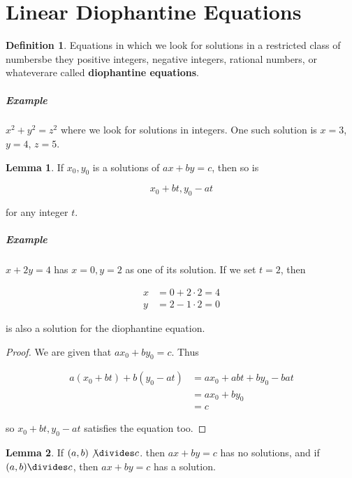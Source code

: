 \documentclass{article}
\theoremstyle{definition} %
\theoremstyle{definition}
\theoremstyle{definition}
\newtheorem{lemma}{Lemma}[section]
\theoremstyle{definition}
\newtheorem{definition}{Definition}[section]
\begin{document}
  \section{Linear Diophantine Equations}
  
  \begin{definition}
    Equations in which we look for solutions in a restricted class of numbers\textemdash be they positive
    integers, negative integers, rational numbers, or whatever\textemdash are called \textbf{diophantine
    equations}.
  \end{definition}
  
  \subparagraph{Example} $x^2 + y^2 = z^2$ where we look for solutions in integers. One such solution
  is $x = 3$, $y = 4$, $z = 5$.
  
  \begin{lemma}
    If $x_0, y_0$ is a solutions of $ax + by = c$, then so is
    
    \begin{equation*}
      x_0 + bt, y_0 - at
    \end{equation*}
    
    for any integer $t$.
  \end{lemma}
  
  \subparagraph{Example} $x + 2y = 4$ has $x = 0, y = 2$ as one of its solution. If we set $t = 2$, then
  
  \begin{align*}
    x &= 0 + 2 \cdot 2 = 4 \\
    y &= 2 - 1 \cdot 2 = 0
  \end{align*}
  
  is also a solution for the diophantine equation.
  
  \begin{proof}
    We are given that $ax_0 + by_0 = c$. Thus
    
    \begin{align*}
      a(x_0 + bt) + b(y_0 - at) &= ax_0 + abt + by_0 - bat \\
      &= ax_0 + by_0 \\
      &= c
    \end{align*}
    
    so $x_0 + bt, y_0 - at$ satisfies the equation too.
  \end{proof}
  
  \begin{lemma}
    If $(a, b) \not\divides c$. then $ax + by = c$ has no solutions, and if $(a, b) \divides c$, then
    $ax + by = c$ has a solution.
  \end{lemma}
  
\end{document}
